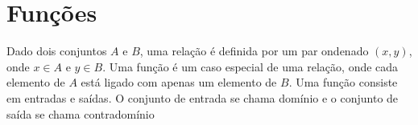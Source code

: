 \documentclass{article}
\begin{document}
\section*{Funções}

Dado dois conjuntos $A$ e $B$, uma relação é definida por um par ondenado $(x, y)$, onde $x \in A$ e $y \in B$.
Uma função é um caso especial de uma relação, onde cada elemento de $A$ está ligado com apenas um elemento de $B$.
Uma função consiste em entradas e saídas. O conjunto de entrada se chama domínio e o conjunto de saída se chama
contradomínio
\end{document}
